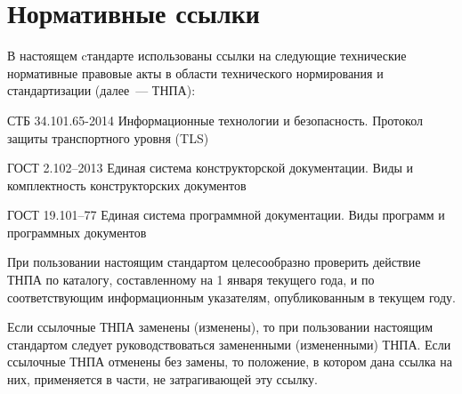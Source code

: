 \chapter{Нормативные ссылки}\label{REFS}

В настоящем cтандарте использованы ссылки на следующие 
технические нормативные правовые акты в области 
технического нормирования и стандартизации (далее~--- ТНПА):

СТБ 34.101.65-2014 Информационные технологии и безопасность. Протокол защиты 
транспортного уровня (TLS)


ГОСТ 2.102–2013 Единая система конструкторской документации. Виды и 
комплектность конструкторских документов

ГОСТ 19.101–77 Единая система программной документации. Виды программ и 
программных документов

\begin{note*}
При пользовании настоящим стандартом целесообразно 
проверить действие ТНПА по каталогу,
составленному на 1 января текущего года, и по соответствующим 
информационным указателям, опубликованным в текущем году.

Если ссылочные ТНПА заменены (изменены), то при пользовании настоящим 
стандартом следует руководствоваться замененными (измененными) ТНПА. 
Если ссылочные ТНПА отменены без замены, то положение, в котором 
дана ссылка на них, применяется в части, не затрагивающей эту ссылку.
\end{note*}


